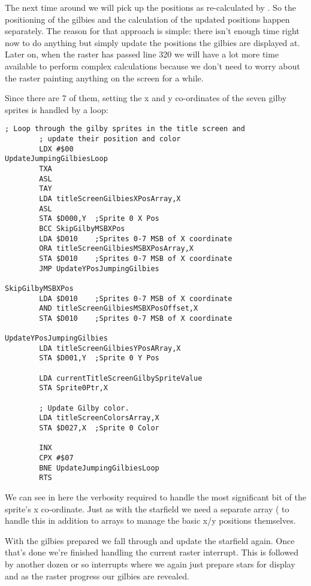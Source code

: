 The next time around we will pick up the positions as re-calculated by .
So the positioning of the gilbies and the calculation of the updated positions happen separately. The reason
for that approach is simple: there isn't enough time right now to do anything but simply update the positions the gilbies
are displayed at.
Later on, when the raster has passed line 320 we will have a lot more time available to perform complex calculations
because we don't need to worry about the raster painting anything on the screen for a while.

Since there are 7 of them, setting the x and y co-ordinates of the seven gilby sprites is handled by a loop:

\begin{lstlisting}[caption= The loop in \icode{UpdateJumpingGilbyPositionsAndColors} updating the x and y position on screen and color of each of the gilby sprites.]
        ; Loop through the gilby sprites in the title screen and
        ; update their position and color
        LDX #$00
UpdateJumpingGilbiesLoop   
        TXA
        ASL
        TAY
        LDA titleScreenGilbiesXPosArray,X
        ASL
        STA $D000,Y  ;Sprite 0 X Pos
        BCC SkipGilbyMSBXPos
        LDA $D010    ;Sprites 0-7 MSB of X coordinate
        ORA titleScreenGilbiesMSBXPosArray,X
        STA $D010    ;Sprites 0-7 MSB of X coordinate
        JMP UpdateYPosJumpingGilbies

SkipGilbyMSBXPos   
        LDA $D010    ;Sprites 0-7 MSB of X coordinate
        AND titleScreenGilbiesMSBXPosOffset,X
        STA $D010    ;Sprites 0-7 MSB of X coordinate

UpdateYPosJumpingGilbies
        LDA titleScreenGilbiesYPosARray,X
        STA $D001,Y  ;Sprite 0 Y Pos

        LDA currentTitleScreenGilbySpriteValue
        STA Sprite0Ptr,X

        ; Update Gilby color.
        LDA titleScreenColorsArray,X
        STA $D027,X  ;Sprite 0 Color

        INX
        CPX #$07
        BNE UpdateJumpingGilbiesLoop
        RTS
\end{lstlisting}
We can see in here the verbosity required to handle the most significant bit of the sprite's x co-ordinate. Just
as with the starfield we need a separate array ( to handle this in addition
to arrays to manage the basic x/y positions themselves.

With the gilbies prepared we fall through and update the starfield again. Once that's done we're finished handling the
current raster interrupt. This is followed by another dozen or so interrupts where we again just prepare stars for display
and as the raster progress our gilbies are revealed.

